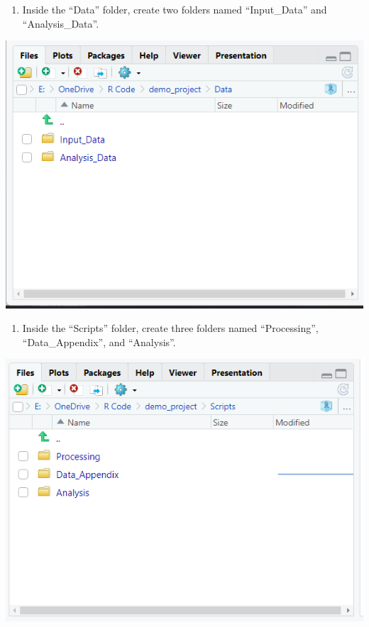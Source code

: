 \documentclass[
]{book}
\providecommand{\tightlist}{%
  \setlength{\itemsep}{0pt}\setlength{\parskip}{0pt}}
\begin{document}
\begin{enumerate}
\def\labelenumi{\arabic{enumi}.}
\setcounter{enumi}{3}
\tightlist
\item
  Inside the ``Data'' folder, create two folders named ``Input\_Data'' and ``Analysis\_Data''.
\end{enumerate}

\includegraphics{images/tierdata.png}

\begin{enumerate}
\def\labelenumi{\arabic{enumi}.}
\setcounter{enumi}{4}
\tightlist
\item
  Inside the ``Scripts'' folder, create three folders named ``Processing'', ``Data\_Appendix'', and ``Analysis''.
\end{enumerate}

\includegraphics{images/tierscripts.png}
\end{document}
